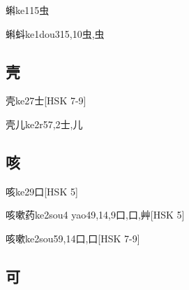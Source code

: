 \begin{EntryWithPhonetic}{蝌}{ke1}{15}{⾍}
\end{EntryWithPhonetic}

\begin{EntryWithPhonetic}{蝌蚪}{ke1dou3}{15,10}{⾍,⾍}
\end{EntryWithPhonetic}

\subsection*{壳}

\begin{EntryWithPhonetic}{壳}{ke2}{7}{⼠}[HSK 7-9]
\end{EntryWithPhonetic}

\begin{EntryWithPhonetic}{壳儿}{ke2r5}{7,2}{⼠,⼉}
\end{EntryWithPhonetic}

\subsection*{咳}

\begin{EntryWithPhonetic}{咳}{ke2}{9}{⼝}[HSK 5]
\end{EntryWithPhonetic}

\begin{EntryWithPhonetic}{咳嗽药}{ke2sou4 yao4}{9,14,9}{⼝,⼝,⾋}[HSK 5]
\end{EntryWithPhonetic}

\begin{EntryWithPhonetic}{咳嗽}{ke2sou5}{9,14}{⼝,⼝}[HSK 7-9]
\end{EntryWithPhonetic}

\subsection*{可}

